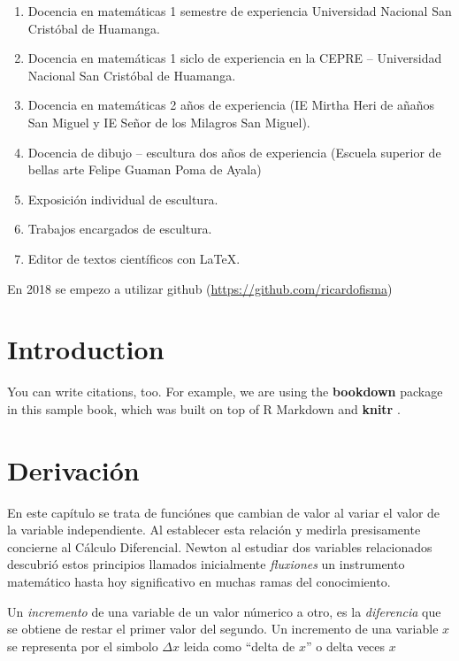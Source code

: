 \documentclass[]{krantz}
\begin{document}
\begin{enumerate}
\def\labelenumi{\arabic{enumi}.}
\item
  Docencia en matemáticas 1 semestre de experiencia Universidad Nacional San Cristóbal de Huamanga.
\item
  Docencia en matemáticas 1 siclo de experiencia en la CEPRE -- Universidad Nacional San Cristóbal de Huamanga.
\item
  Docencia en matemáticas 2 años de experiencia (IE Mirtha Heri de añaños San Miguel y IE Señor de los Milagros San Miguel).
\item
  Docencia de dibujo -- escultura dos años de experiencia (Escuela superior de bellas arte Felipe Guaman Poma de Ayala)
\item
  Exposición individual de escultura.
\item
  Trabajos encargados de escultura.
\item
  Editor de textos científicos con LaTeX.
\end{enumerate}

En 2018 se empezo a utilizar github (\url{https://github.com/ricardofisma})

\hypertarget{introduction}{%
\chapter*{Introduction}\label{introduction}}

You can write citations, too. For example, we are using the \textbf{bookdown} package \citep{R-bookdown} in this sample book, which was built on top of R Markdown and \textbf{knitr} \citep{xie2015}.

\mainmatter

\hypertarget{derivaciuxf3n}{%
\chapter{Derivación}\label{derivaciuxf3n}}

En este capítulo se trata de funciónes que cambian de valor al variar el valor de la variable independiente. Al establecer esta relación y medirla presisamente concierne al Cálculo Diferencial. Newton al estudiar dos variables relacionados descubrió estos principios llamados inicialmente \emph{fluxiones} un instrumento matemático hasta hoy significativo en muchas ramas del conocimiento.

Un \emph{incremento} de una variable de un valor númerico a otro, es la \emph{diferencia} que se obtiene de restar el primer valor del segundo. Un incremento de una variable \(x\) se representa por el simbolo \(\Delta x\) leida como ``delta de \(x\)'' o delta veces \(x\)
\end{document}

